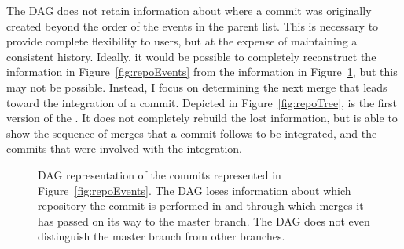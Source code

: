The DAG does not retain information about where a commit was originally
created beyond the order of the events in the parent list. This is
necessary to provide complete flexibility to users, but at the expense
of maintaining a consistent history. Ideally, it would be possible to
completely reconstruct the information in Figure~\ref{fig:repoEvents}
from the information in Figure~\ref{fig:repoDAG}, but this may not be
possible. Instead, I focus on determining the next merge that leads
toward the integration of a commit. Depicted in
Figure~\ref{fig:repoTree}, is the first version of the \mt. It does not
completely rebuild the lost information, but is able to show the
sequence of merges that a commit follows to be integrated, and the
commits that were involved with the integration.

\begin{figure}[htbp]
  \centering
  \caption{DAG representation of the commits represented in
    Figure~\ref{fig:repoEvents}. The DAG loses information about which
    repository the commit is performed in and through which merges it
    has passed on its way to the master branch. The DAG does not even
    distinguish the master branch from other branches.}
  \label{fig:repoDAG}
\end{figure}

